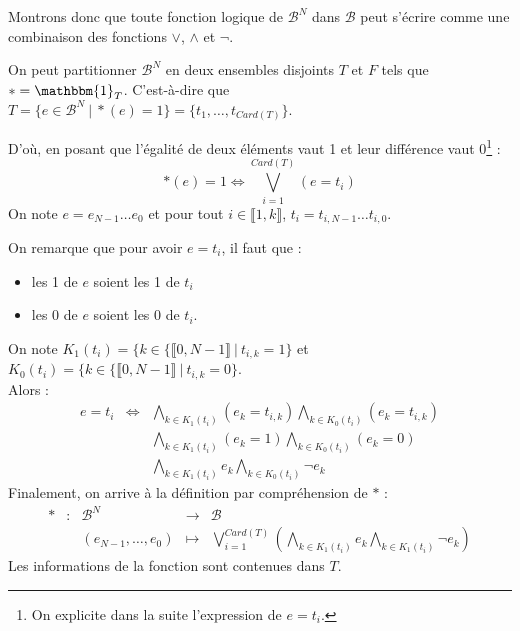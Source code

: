 \documentclass[../main.tex]{subfiles}
\begin{document}
Montrons donc que toute fonction logique de $\mathcal{B}^{N}$ dans $\mathcal{B}$ peut s'écrire comme une combinaison des fonctions $\vee$, $\wedge$ et $\neg$.

On peut partitionner $\mathcal{B}^{N}$ en deux ensembles disjoints $T$ et $F$ tels que $\ast = \mathbbm{1}_{T}$. C'est-à-dire que $T = \{e\in\mathcal{B}^{N}\ |\ \ast(e) = 1\} = \{t_{1}, \dots, t_{Card(T)}\}$.

D'où, en posant que l'égalité de deux éléments vaut 1 et leur différence vaut 0\footnote{On explicite dans la suite l'expression de $e = t_{i}$.} :
\begin{equation}
	\ast(e) = 1 \Leftrightarrow \displaystyle\bigvee_{i = 1}^{Card(T)}(e = t_i)
\end{equation}
On note $e = e_{N-1}\dots e_{0}$ et pour tout $i\in{\llbracket 1, k\rrbracket}$, $t_{i} = t_{i, N-1}\dots t_{i, 0}$.

On remarque que pour avoir $e = t_{i}$, il faut que :
\begin{itemize}
	\item les 1 de $e$ soient les 1 de $t_{i}$
	\item les 0 de $e$ soient les 0 de $t_{i}$.
\end{itemize}
On note $K_{1}(t_{i}) = \{k\in\{\llbracket 0, N-1\rrbracket\ |\ t_{i, k} = 1\}$ et $K_{0}(t_{i}) = \{k\in\{\llbracket 0, N-1\rrbracket\ |\ t_{i, k} = 0\}$. \\
Alors :
$$
\begin{array}{lcl}
	e = t_i & \Leftrightarrow & \displaystyle\bigwedge_{k\in{K_{1}(t_i)}}(e_k = t_{i, k})\displaystyle\bigwedge_{k\in{K_{0}(t_i)}}(e_k = t_{i, k}) \\
 & & \displaystyle\bigwedge_{k\in{K_{1}(t_i)}}(e_k = 1)\displaystyle\bigwedge_{k\in{K_{0}(t_i)}}(e_k = 0) \\
 & & \displaystyle\bigwedge_{k\in{K_{1}(t_i)}}e_k\displaystyle\bigwedge_{k\in{K_{0}(t_i)}}\neg{e_k}
\end{array}
$$
Finalement, on arrive à la définition par compréhension de $\ast$ :
\begin{displaymath}
\begin{array}{lclcl}
\ast & : & \mathcal{B}^{N} & \rightarrow & \mathcal{B} \\
& & (e_{N-1}, \dots, e_{0}) & \mapsto & \displaystyle\bigvee_{i = 1}^{Card(T)}\left(\displaystyle\bigwedge_{k\in{K_{1}(t_i)}}e_k\displaystyle\bigwedge_{k\in{K_{1}(t_i)}}\neg{e_k}\right)
\end{array}
\end{displaymath}
Les informations de la fonction sont contenues dans $T$.
\end{document}
